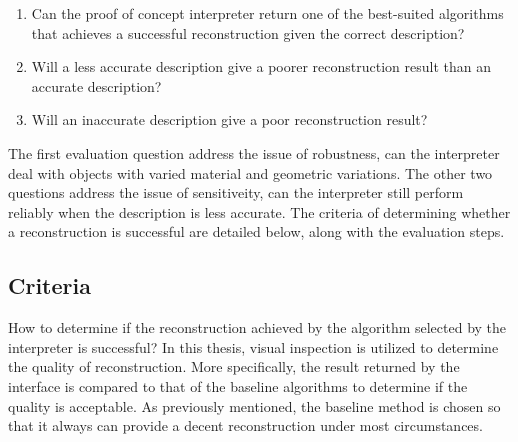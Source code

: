 \begin{enumerate}
\item Can the proof of concept interpreter return one of the best-suited algorithms that achieves a successful reconstruction given the correct description?
\item Will a less accurate description give a poorer reconstruction result than an accurate description?
\item Will an inaccurate description give a poor reconstruction result?
\end{enumerate}
The first evaluation question address the issue of robustness, \ie can the interpreter deal with objects with varied material and geometric variations. The other two questions address the issue of sensitiveity, \ie can the interpreter still perform reliably when the description is less accurate. The criteria of determining whether a reconstruction is successful are detailed below, along with the evaluation steps.

\subsection{Criteria}
How to determine if the reconstruction achieved by the algorithm selected by the interpreter is successful? In this thesis, visual inspection is utilized to determine the quality of reconstruction. More specifically, the result returned by the interface is compared to that of the baseline algorithms to determine if the quality is acceptable. As previously mentioned, the baseline method is chosen so that it always can provide a decent reconstruction under most circumstances.

